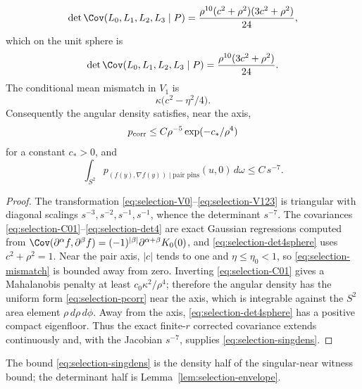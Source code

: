 \begin{lemma}
\begin{equation}\label{eq:selection-det4}
\det\Cov(L_0,L_1,L_2,L_3\mid P)=\frac{\rho^{10}(c^2+\rho^2)(3c^2+\rho^2)}{24},
\end{equation}
which on the unit sphere is
\begin{equation}\label{eq:selection-det4sphere}
\det\Cov(L_0,L_1,L_2,L_3\mid P)=\frac{\rho^{10}(3c^2+\rho^2)}{24}.
\end{equation}
The conditional mean mismatch in $V_1$ is
\begin{equation}\label{eq:selection-mismatch}
\kappa\bigl(c^2-\eta^2/4\bigr).
\end{equation}
Consequently the angular density satisfies, near the axis,
\begin{equation}\label{eq:selection-pcorr}
p_{\rm corr}\le C\rho^{-5}\exp(-c_*/\rho^4)
\end{equation}
for a constant $c_*>0$, and
\begin{equation}\label{eq:selection-singdens}
\int_{S^2}p_{(f(y),\nabla f(y))\mid\text{pair pins}}(u,0)\,d\omega\le C\,s^{-7}.
\end{equation}
\end{lemma}

\begin{proof}
The transformation \eqref{eq:selection-V0}--\eqref{eq:selection-V123} is triangular with diagonal scalings $s^{-3},s^{-2},s^{-1},s^{-1}$, whence the determinant $s^{-7}$. The covariances \eqref{eq:selection-C01}--\eqref{eq:selection-det4} are exact Gaussian regressions computed from $\Cov(\partial^\alpha f,\partial^\beta f)=(-1)^{|\beta|}\partial^{\alpha+\beta}K_0(0)$, and \eqref{eq:selection-det4sphere} uses $c^2+\rho^2=1$. Near the pair axis, $|c|$ tends to one and $\eta\le\eta_0<1$, so \eqref{eq:selection-mismatch} is bounded away from zero. Inverting \eqref{eq:selection-C01} gives a Mahalanobis penalty at least $c_0\kappa^2/\rho^4$; therefore the angular density has the uniform form \eqref{eq:selection-pcorr} near the axis, which is integrable against the $S^2$ area element $\rho\,d\rho\,d\phi$. Away from the axis, \eqref{eq:selection-det4sphere} has a positive compact eigenfloor. Thus the exact finite-$r$ corrected covariance extends continuously and, with the Jacobian $s^{-7}$, supplies \eqref{eq:selection-singdens}.
\end{proof}

The bound \eqref{eq:selection-singdens} is the density half of the singular-near witness bound; the determinant half is Lemma~\ref{lem:selection-envelope}.


